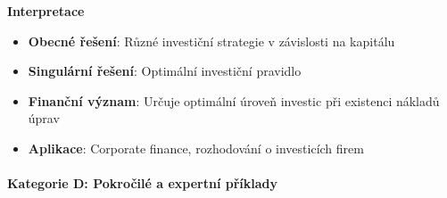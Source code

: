 \begin{example}
\vspace{1.5\baselineskip}

\noindent\textbf{Interpretace}
\begin{itemize}
\item \textbf{Obecné řešení}: Různé investiční strategie v závislosti na kapitálu
\item \textbf{Singulární řešení}: Optimální investiční pravidlo
\item \textbf{Finanční význam}: Určuje optimální úroveň investic při existenci nákladů úprav
\item \textbf{Aplikace}: Corporate finance, rozhodování o investicích firem
\end{itemize}

\end{example}

\paragraph*{Kategorie D: Pokročilé a expertní příklady}

